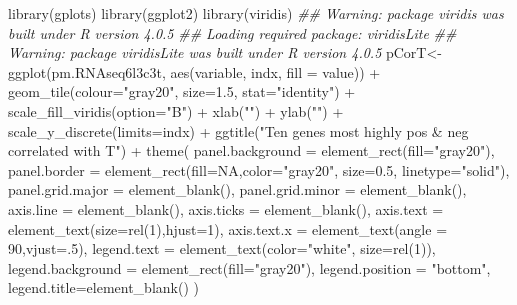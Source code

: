 \documentclass[]{article}
\newcommand{\hlnum}[1]{\textcolor[rgb]{0.816,0.125,0.439}{#1}}%
\newcommand{\hlstr}[1]{\textcolor[rgb]{0.251,0.627,0.251}{#1}}%
\newcommand{\hlcom}[1]{\textcolor[rgb]{0.502,0.502,0.502}{\textit{#1}}}%
\newcommand{\hlopt}[1]{\textcolor[rgb]{0,0,0}{#1}}%
\newcommand{\hlstd}[1]{\textcolor[rgb]{0.251,0.251,0.251}{#1}}%
\newcommand{\hlkwc}[1]{\textcolor[rgb]{0.251,0.251,0.251}{#1}}%
\newcommand{\hlkwd}[1]{\textcolor[rgb]{0.878,0.439,0.125}{#1}}%
\newenvironment{Shaded}{\begin{myshaded}}{\end{myshaded}}
\newcommand{\KeywordTok}[1]{\hlkwd{#1}}
\newcommand{\DataTypeTok}[1]{\hlkwc{#1}}
\newcommand{\DecValTok}[1]{\hlnum{#1}}
\newcommand{\FloatTok}[1]{\hlnum{#1}}
\newcommand{\StringTok}[1]{\hlstr{#1}}
\newcommand{\CommentTok}[1]{\hlcom{#1}}
\newcommand{\OtherTok}[1]{{#1}}
\newcommand{\OperatorTok}[1]{\hlopt{#1}}
\newcommand{\NormalTok}[1]{\hlstd{#1}}
\begin{document}
\begin{Shaded}
\begin{Highlighting}[]
\KeywordTok{library}\NormalTok{(gplots)}
\KeywordTok{library}\NormalTok{(ggplot2)}
\KeywordTok{library}\NormalTok{(viridis)}
\CommentTok{\#\# Warning: package \textquotesingle{}viridis\textquotesingle{} was built under R version 4.0.5}
\CommentTok{\#\# Loading required package: viridisLite}
\CommentTok{\#\# Warning: package \textquotesingle{}viridisLite\textquotesingle{} was built under R version 4.0.5}
\NormalTok{pCorT<{-}}\KeywordTok{ggplot}\NormalTok{(pm.RNAseq6l3c3t, }\KeywordTok{aes}\NormalTok{(variable, indx, }\DataTypeTok{fill =}\NormalTok{ value)) }\OperatorTok{+}
\StringTok{  }\KeywordTok{geom\_tile}\NormalTok{(}\DataTypeTok{colour=}\StringTok{"gray20"}\NormalTok{, }\DataTypeTok{size=}\FloatTok{1.5}\NormalTok{, }\DataTypeTok{stat=}\StringTok{"identity"}\NormalTok{) }\OperatorTok{+}
\StringTok{  }\KeywordTok{scale\_fill\_viridis}\NormalTok{(}\DataTypeTok{option=}\StringTok{"B"}\NormalTok{) }\OperatorTok{+}
\StringTok{  }\KeywordTok{xlab}\NormalTok{(}\StringTok{""}\NormalTok{) }\OperatorTok{+}\StringTok{  }\KeywordTok{ylab}\NormalTok{(}\StringTok{""}\NormalTok{) }\OperatorTok{+}
\StringTok{  }\KeywordTok{scale\_y\_discrete}\NormalTok{(}\DataTypeTok{limits=}\NormalTok{indx) }\OperatorTok{+}
\StringTok{  }\KeywordTok{ggtitle}\NormalTok{(}\StringTok{"Ten genes most highly pos \& neg correlated with T"}\NormalTok{) }\OperatorTok{+}
\StringTok{  }\KeywordTok{theme}\NormalTok{(}
    \DataTypeTok{panel.background =} \KeywordTok{element\_rect}\NormalTok{(}\DataTypeTok{fill=}\StringTok{"gray20"}\NormalTok{),}
    \DataTypeTok{panel.border =} \KeywordTok{element\_rect}\NormalTok{(}\DataTypeTok{fill=}\OtherTok{NA}\NormalTok{,}\DataTypeTok{color=}\StringTok{"gray20"}\NormalTok{, }\DataTypeTok{size=}\FloatTok{0.5}\NormalTok{, }\DataTypeTok{linetype=}\StringTok{"solid"}\NormalTok{),}
    \DataTypeTok{panel.grid.major =} \KeywordTok{element\_blank}\NormalTok{(),}
    \DataTypeTok{panel.grid.minor =} \KeywordTok{element\_blank}\NormalTok{(),}
    \DataTypeTok{axis.line =} \KeywordTok{element\_blank}\NormalTok{(),}
    \DataTypeTok{axis.ticks =} \KeywordTok{element\_blank}\NormalTok{(),}
    \DataTypeTok{axis.text =} \KeywordTok{element\_text}\NormalTok{(}\DataTypeTok{size=}\KeywordTok{rel}\NormalTok{(}\DecValTok{1}\NormalTok{),}\DataTypeTok{hjust=}\DecValTok{1}\NormalTok{),}
    \DataTypeTok{axis.text.x =} \KeywordTok{element\_text}\NormalTok{(}\DataTypeTok{angle =} \DecValTok{90}\NormalTok{,}\DataTypeTok{vjust=}\NormalTok{.}\DecValTok{5}\NormalTok{),}
    \DataTypeTok{legend.text =} \KeywordTok{element\_text}\NormalTok{(}\DataTypeTok{color=}\StringTok{"white"}\NormalTok{, }\DataTypeTok{size=}\KeywordTok{rel}\NormalTok{(}\DecValTok{1}\NormalTok{)),}
    \DataTypeTok{legend.background =} \KeywordTok{element\_rect}\NormalTok{(}\DataTypeTok{fill=}\StringTok{"gray20"}\NormalTok{),}
    \DataTypeTok{legend.position =} \StringTok{"bottom"}\NormalTok{,}
    \DataTypeTok{legend.title=}\KeywordTok{element\_blank}\NormalTok{()}
\NormalTok{)}
\end{Highlighting}
\end{Shaded}
\end{document}
